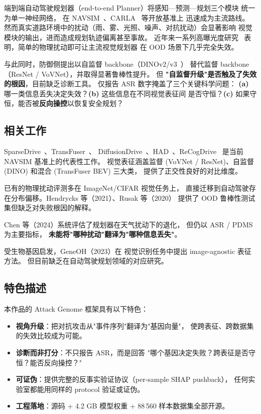 \documentclass[a4paper,12pt,fontset=fandol]{ctexart}
\begin{document}
端到端自动驾驶规划器（end-to-end Planner）将感知—预测—规划三个模块
统一为单一神经网络，
在 NAVSIM~\cite{NAVSIM2024}、CARLA~\cite{CARLA2017} 等开放基准上
迅速成为主流路线。
然而真实道路环境中的扰动（雨、雾、光照、噪声、对抗扰动）会显著影响
视觉模块的输出，进而造成规划轨迹偏离甚至事故。
近年来一系列高曝光度研究~\cite{ADVATTACK2017,Wu2020,Ranjan2022}
表明，简单的物理扰动即可让主流视觉规划器
在 OOD 场景下几乎完全失效。

与此同时，防御侧提出以自监督 backbone（DINOv2/v3~\cite{DINOv2,Oquab2024}）
替代监督 backbone（ResNet / VoVNet），并取得显著鲁棒性提升。
但 \textbf{"自监督升级"是否触及了失效的根因}，目前缺乏诊断工具。
仅报告 ASR 数字掩盖了三个关键科学问题：
\textbf{(a)} 哪一类信息丢失决定失效？\textbf{(b)} 这些信息在不同视觉表征间
是否守恒？\textbf{(c)} 如果守恒，能否被\textbf{反向操控}以恢复安全规划？

\subsection{相关工作}

\begin{description}[leftmargin=1.4em,style=nextline]
\item[端到端规划器] SparseDrive~\cite{SparseDrive2024}、TransFuser~\cite{TransFuser2022}、
      DiffusionDrive~\cite{DiffusionDrive2024}、HAD~\cite{HAD2024}、ReCogDrive~\cite{ReCogDrive2024}
      是当前 NAVSIM 基准上的代表性工作。
      视觉表征涵盖监督 (VoVNet / ResNet)、自监督 (DINO) 和混合 (TransFuser BEV) 三大类，
      提供了正交性良好的对比维度。
\item[对抗鲁棒性评测] 已有的物理扰动评测多在 ImageNet/CIFAR 视觉任务上，
      直接迁移到自动驾驶存在分布偏移。Hendrycks 等（2021）、Rusak 等（2020）
      提供了 OOD 鲁棒性测试集但缺乏对失败根因的解释。
\item[自动驾驶安全] Chen 等（2024）系统评估了规划器在天气扰动下的退化，
      但仍以 ASR / PDMS 为主要指标，
      \textbf{未能将"哪种扰动"翻译为"哪种信息丢失"}。
\item[基因可解释性] 受生物基因启发，GeneOH（2023）在
      视觉识别任务中提出 image-agnostic 表征方法。
      但目前缺乏在自动驾驶规划领域的对应研究。
\end{description}

\subsection{特色描述}

本作品的 Attack Genome 框架具有以下特色：
\begin{itemize}
\item \textbf{视角升级}：把对抗攻击从"事件序列"翻译为"基因向量"，
      使跨表征、跨数据集的失效比较成为可能。
\item \textbf{诊断而非打分}：不只报告 ASR，而是回答
      "哪个基因决定失败？跨表征是否守恒？能否反向操控？"
\item \textbf{可证伪}：提供完整的反事实验证协议（per-sample SHAP pushback），
      任何实验室都能用同样的 protocol 验证或证伪。
\item \textbf{工程落地}：源码 + 4.2 GB 模型权重 + 88\,560 样本数据集全部开源。
\end{itemize}
\end{document}
